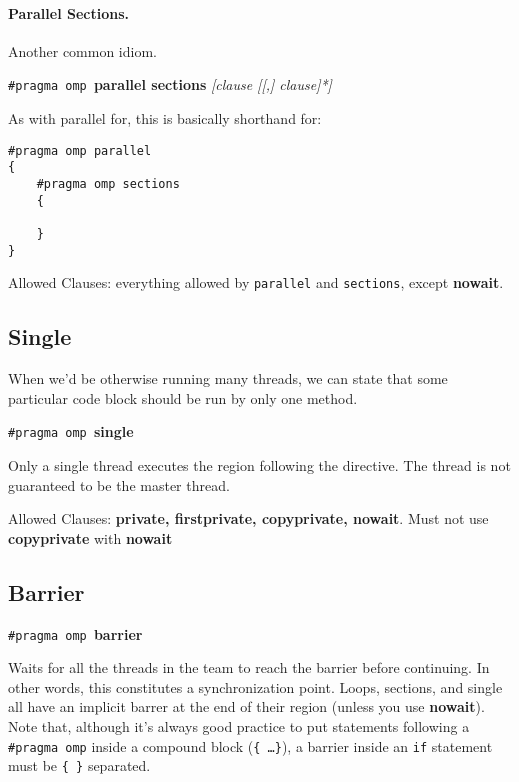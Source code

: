 \paragraph{Parallel Sections.} Another common idiom.
  \begin{center}
    {\tt \#pragma omp }{\bf parallel sections} {\it [clause [[,] clause]*]}
  \end{center}

  As with parallel for, this is basically shorthand for:
  
  \begin{lstlisting}
#pragma omp parallel
{
    #pragma omp sections
    {

    }
}
  \end{lstlisting}

  Allowed Clauses: everything allowed by {\tt parallel} and {\tt sections}, except
  {\bf nowait}.
\newpage
  \subsection*{Single} When we'd be otherwise running many threads, we can state
that some particular code block should be run by only one method.

  \begin{center}
    {\tt \#pragma omp }{\bf single}
  \end{center}
    Only a single thread executes the region following the directive.
    The thread is not guaranteed to be the master thread.

  Allowed Clauses: {\bf private, firstprivate, copyprivate, nowait}.
 Must not use {\bf copyprivate} with {\bf nowait}

  \subsection*{Barrier}

  \begin{center}
    {\tt \#pragma omp }{\bf barrier}
  \end{center}

     Waits for all the threads in the team to reach the barrier before
      continuing. In other words, this constitutes a synchronization point.
     Loops, sections, and single all have an implicit barrer at the end of their
      region (unless you use {\bf nowait}).
     Note that, although it's always good practice to put statements following a {\tt \#pragma omp} inside a compound block ({\tt \{ \ldots \}}), a barrier inside an {\tt if} statement must be {\tt \{  \}} separated.

